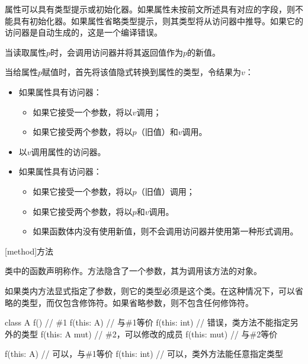 \pnum
属性可以具有类型提示或初始化器。如果属性未按前文所述具有对应的字段，则不能具有初始化器。如果属性省略类型提示，则其类型将从访问器中推导。如果它的访问器是自动生成的，这是一个编译错误。

\pnum
当读取属性$p$时，会调用访问器并将其返回值作为$p$的新值。

\pnum
当给属性$p$赋值时，首先将该值隐式转换到属性的类型，令结果为$v$：

\begin{itemize}
    \item 如果属性具有访问器：
    \begin{itemize}
        \item 如果它接受一个参数，将以$v$调用；
        \item 如果它接受两个参数，将以$p$（旧值）和$v$调用。
    \end{itemize}
    \item 以$v$调用属性的访问器。
    \item 如果属性具有访问器：
    \begin{itemize}
        \item 如果它接受一个参数，将以$p$（旧值）调用；
        \item 如果它接受两个参数，将以$p$和$v$调用。
        \item 如果函数体内没有使用新值，则不会调用访问器并使用第一种形式调用。
    \end{itemize}
\end{itemize}

[method]{方法}

\pnum
类中的函数声明称作。方法隐含了一个参数，其为调用该方法的对象。

\pnum
如果类内方法显式指定了参数，则它的类型必须是这个类。在这种情况下，可以省略的类型，而仅包含修饰符。如果省略参数，则不包含任何修饰符。

\enterexample
\begin{codeblock}
class A {
    f() { } // \#1
    f(this: A) { } // 与\#1等价
    f(this: int) { } // 错误，类方法不能指定另外的类型
    f(this: A mut) { } // \#2，可以修改的成员
    f(this: mut) { } // 与\#2等价
}

f(this: A) { } // 可以，与\#1等价
f(this: int) { } // 可以，类外方法能任意指定类型
\end{codeblock}
\exitexample

